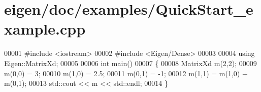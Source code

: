 \hypertarget{eigen_2doc_2examples_2_quick_start__example_8cpp_source}{}\section{eigen/doc/examples/\+Quick\+Start\+\_\+example.cpp}
\label{eigen_2doc_2examples_2_quick_start__example_8cpp_source}

\begin{DoxyCode}
00001 \textcolor{preprocessor}{#include <iostream>}
00002 \textcolor{preprocessor}{#include <Eigen/Dense>}
00003 
00004 \textcolor{keyword}{using} Eigen::MatrixXd;
00005 
00006 \textcolor{keywordtype}{int} main()
00007 \{
00008   MatrixXd m(2,2);
00009   m(0,0) = 3;
00010   m(1,0) = 2.5;
00011   m(0,1) = -1;
00012   m(1,1) = m(1,0) + m(0,1);
00013   std::cout << m << std::endl;
00014 \}
\end{DoxyCode}
